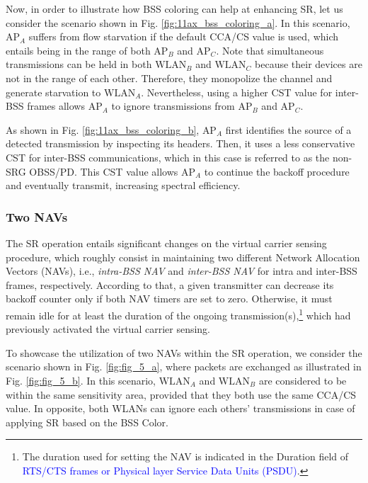 \documentclass[comsoc]{IEEEtran}
\begin{document}
	Now, in order to illustrate how BSS coloring can help at enhancing SR, let us consider the scenario shown in Fig. \ref{fig:11ax_bss_coloring_a}. In this scenario, $\text{AP}_{A}$ suffers from flow starvation if the default CCA/CS value is used, which entails being in the range of both $\text{AP}_B$ and $\text{AP}_C$. Note that simultaneous transmissions can be held in both $\text{WLAN}_B$ and $\text{WLAN}_C$ because their devices are not in the range of each other. Therefore, they monopolize the channel and generate starvation to $\text{WLAN}_A$. Nevertheless, using a higher CST value for inter-BSS frames allows $\text{AP}_{A}$ to ignore transmissions from $\text{AP}_B$ and $\text{AP}_C$. 
	
	As shown in Fig. \ref{fig:11ax_bss_coloring_b}, $\text{AP}_A$ first identifies the source of a detected transmission by inspecting its headers. Then, it uses a less conservative CST for inter-BSS communications, which in this case is referred to as the non-SRG OBSS/PD. This CST value allows $\text{AP}_A$ to continue the backoff procedure and eventually transmit, increasing spectral efficiency.
	
	\subsubsection{Two NAVs}
	\label{section:two_navs}
	The SR operation entails significant changes on the virtual carrier sensing procedure, which roughly consist in maintaining two different Network Allocation Vectors (NAVs), i.e., \emph{intra-BSS NAV} and \emph{inter-BSS NAV} for intra and inter-BSS frames, respectively. According to that, a given transmitter can decrease its backoff counter only if both NAV timers are set to zero. Otherwise, it must remain idle for at least the duration of the ongoing transmission(s),\footnote{The duration used for setting the NAV is indicated in the Duration field of \textcolor{blue}{RTS/CTS frames or Physical layer Service Data Units (PSDU)}.} which had previously activated the virtual carrier sensing. 
	
	To showcase the utilization of two NAVs within the SR operation, we consider the scenario shown in Fig. \ref{fig:fig_5_a}, where packets are exchanged as illustrated in Fig. \ref{fig:fig_5_b}. In this scenario, $\text{WLAN}_A$ and $\text{WLAN}_B$ are considered to be within the same sensitivity area, provided that they both use the same CCA/CS value. In opposite, both WLANs can ignore each others' transmissions in case of applying SR based on the BSS Color.
	
\end{document}
